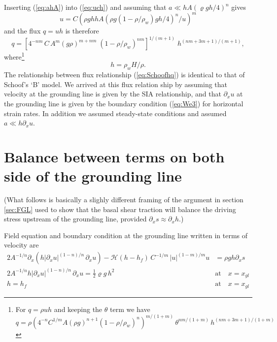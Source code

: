 \documentclass[10pt,a4paper]{book}
\newcommand{\He}{\mathcal{H}}
\newcommand{\p}{\partial}
\begin{document}
Inserting (\ref{eq:ahA}) into (\ref{eq:uch}) and assuming that $a \ll
h A (\varrho g h/4)^n $ gives
\begin{equation}
   u = C \left (\rho g h h A (\rho g (1-\rho/\rho_w) g h/4)^n /u \right )^m 
\label{eq:uch2}
\end{equation}
and the flux  $q=uh$ is therefore
\begin{equation}
q=  \left [ 4^{-n m} \, C \, A^m  (g \rho)^{m+n m} \; \left (1-\rho/\rho_w \right )^{n m}  \right ]^{1/(m+1)}  \; h^{(n m + 3 m + 1)/(m+1)} ,
\label{eq:Schoofhq}
\end{equation}
where\footnote{For $q=\rho u h$ and keeping the $\theta$ term we have
\[
q=\rho  \left ( 4^{-n} C^{1/m} A (\rho g)^{n+1} (1-\rho/\rho_w)^n  \right )^{m/(1+m)} \, \theta^{nm/(1+m)} \,  h^{(n m +3 m+1)/(1+m)} 
\]
}
\[
h=\rho_w H /\rho.
\]
The relationship between flux relationship (\ref{eq:Schoofhq}) is
identical to that of Schoof's `B' model.
We arrived at this flux relation ship by assuming that velocity at
the grounding line is given by the SIA relationship, and that $\p_x u$
at the grounding line is given by the boundary condition
(\ref{eq:We3}) for horizontal strain rates. In addition we assumed
steady-state conditions and assumed $a \ll h \p_x u$.




\section{Balance between terms on both side of the grounding line}

(What follows is basically a slighly different framing of the argument in
section \ref{sec:FGL} used to show that the basal shear traction will
balance the driving stress upstream of the grounding line, provided
$\p_x s \approx \p_x h$.)

Field equation and boundary condition at the
grounding line written in terms of velocity are
\begin{align}
2 A^{-1/n} \p_x \left (h |\p_x u|^{(1-n)/n} \, \p_x u \right ) - \He(h-h_f) \, C^{-1/m} \, |u|^{(1-m)/m} u & = \rho g h \p_x s  \label{eq:velssa}\\
2 A^{-1/n} h |\p_x u|^{(1-n)/n}   \, \p_x u  = \frac{1}{2} \varrho g \, h^2   \quad & \text{at} \quad x=x_{gl}\label{eq:bc1b} \\
h=h_f     \quad & \text{at} \quad x=x_{gl}\label{eq:bc2b}
\end{align}
\end{document}
